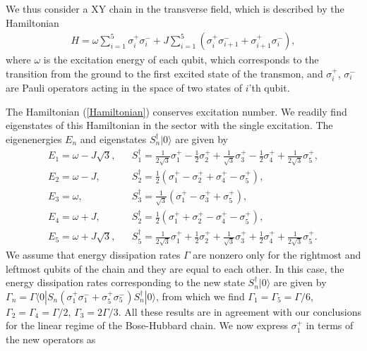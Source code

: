 \documentclass[%
 aps, pra,
 amsmath,amssymb,
 preprint,%
superscriptaddress
]{revtex4-2}
\begin{document}
We thus consider a XY chain in the transverse field, which is described
by the Hamiltonian
\begin{eqnarray}
H = \omega \sum_{i=1}^{5} \sigma_i^{+} \sigma_i^{-} + J
\sum_{i=1}^{5}(\sigma_i^{+} \sigma_{i+1}^{-} + \sigma_{i+1}^{+}
\sigma_i^{-}),
\label{Hamiltonian}
\end{eqnarray}
where $\omega$ is the excitation energy of each qubit, which corresponds to the transition from the ground to the first excited state of the transmon, and $\sigma_i^{+}$, $\sigma_i^{-}$ are Pauli operators acting in the space of two states of $i$'th qubit.

The Hamiltonian (\ref{Hamiltonian}) conserves excitation number. We readily find eigenstates of this Hamiltonian in the sector with the single excitation. The eigenenergies $E_n$ and eigenstates $S_n^{\dagger} |0\rangle$ are given by
\begin{eqnarray}
E_1 = \omega - J \sqrt{3}, &&
S_1^{\dagger}=\frac{1}{2\sqrt{3}}\sigma_1^{+} - \frac{1}{2}\sigma_2^{+} + \frac{1}{\sqrt{3}}\sigma_3^{+} - \frac{1}{2}\sigma_4^{+} + \frac{1}{2\sqrt{3}}\sigma_5^{+},
\\ \nonumber
E_2 = \omega - J , &&
S_2^{\dagger}=\frac{1}{2}\left(\sigma_1^{+} - \sigma_2^{+} + \sigma_4^{+} - \sigma_5^{+}\right),
\\ \nonumber
E_3 = \omega, &&
S_3^{\dagger}=\frac{1}{\sqrt{3}}\left(\sigma_1^{+} - \sigma_3^{+} + \sigma_5^{+}\right),
\\ \nonumber
E_4 = \omega + J , &&
S_2^{\dagger}=\frac{1}{2}\left(\sigma_1^{+} + \sigma_2^{+} - \sigma_4^{+} - \sigma_5^{+}\right),
\\ \nonumber
E_5 = \omega + J \sqrt{3}, &&
S_5^{\dagger}=\frac{1}{2\sqrt{3}}\sigma_1^{+} + \frac{1}{2}\sigma_2^{+} + \frac{1}{\sqrt{3}}\sigma_3^{+} + \frac{1}{2}\sigma_4^{+} + \frac{1}{2\sqrt{3}}\sigma_5^{+}.
\label{Eigen}
\end{eqnarray}
We assume that energy dissipation rates $\Gamma$ are nonzero only for the rightmost and leftmost qubits of the chain and they are equal to each other. In this case, the energy dissipation rates corresponding to the new state $S_n^{\dagger} |0\rangle$ are given by $\Gamma_n=\Gamma \langle 0 |S_n (\sigma_1^{+} \sigma_1^{-} +  \sigma_5^{+} \sigma_5^{-} )S_n^{\dagger} |0\rangle$, from which we find $\Gamma_1=\Gamma_5 = \Gamma /6$, $\Gamma_2=\Gamma_4= \Gamma/2$, $\Gamma_3= 2\Gamma /3$. All these results are in agreement with our conclusions for the linear regime of the Bose-Hubbard chain. We now express $\sigma_1^{+}$ in terms of the new operators as
\end{document}
